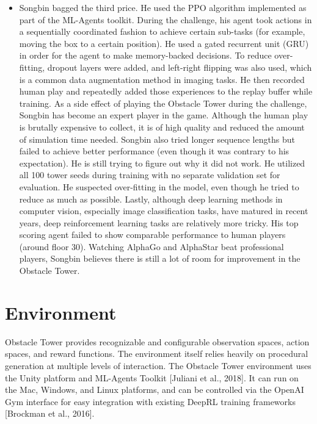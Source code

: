 \documentclass[conference]{IEEEtran}
\begin{document}
\begin{itemize}
\item Songbin bagged the third price. He used the PPO algorithm implemented as part of the ML-Agents toolkit. During the challenge, his agent took actions in a sequentially coordinated fashion to achieve certain sub-tasks (for example, moving the box to a certain position). He used a gated recurrent unit (GRU) in order for the agent to make memory-backed decisions. To reduce over-fitting, dropout layers were added, and left-right flipping was also used, which is a common data augmentation method in imaging tasks. He then recorded human play and repeatedly added those experiences to the replay buffer while training. As a side effect of playing the Obstacle Tower during the challenge, Songbin has become an expert player in the game. Although the human play is brutally expensive to collect, it is of high quality and reduced the amount of simulation time needed. Songbin also tried longer sequence lengths but failed to achieve better performance (even though it was contrary to his expectation). He is still trying to figure out why it did not work. He utilized all 100 tower seeds during training with no separate validation set for evaluation. He suspected over-fitting in the model, even though he tried to reduce as much as possible.
Lastly, although deep learning methods in computer vision, especially image classification tasks, have matured in recent years, deep reinforcement learning tasks are relatively more tricky. His top scoring agent failed to show comparable performance to human players (around floor 30). Watching AlphaGo and AlphaStar beat professional players, Songbin believes there is still a lot of room for improvement in the Obstacle Tower.
\end{itemize}

\section{Environment}
Obstacle Tower provides recognizable and configurable observation spaces, action spaces, and reward functions. The environment itself relies heavily on procedural generation at multiple levels of interaction. The Obstacle Tower environment uses the Unity platform and ML-Agents Toolkit [Juliani et al., 2018]. It can run on the Mac, Windows, and Linux platforms, and can be controlled via the OpenAI Gym interface for easy integration with existing DeepRL training frameworks [Brockman et al., 2016].
\end{document}
